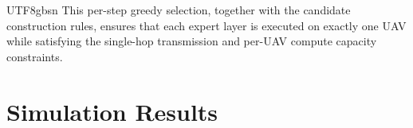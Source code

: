 \documentclass[journal]{IEEEtran}
\begin{document}
\begin{CJK*}{UTF8}{gbsn}
This per-step greedy selection, together with the candidate construction rules, ensures that each expert layer is executed on exactly one UAV while satisfying the single-hop transmission and per-UAV compute capacity constraints.
\section{Simulation Results}
\label{sec:eval}










\end{CJK*}
\end{document}

